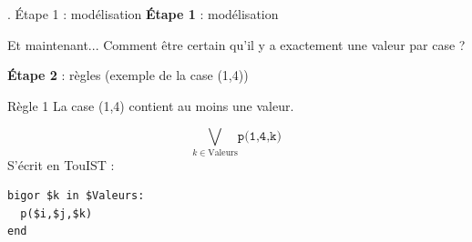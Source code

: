 \documentclass[english,french,usenames,dvipsnames]{beamer}
\begin{document}
\begin{frame}{\subsecname. Étape 1 : modélisation}
\textbf{Étape 1} : modélisation
\begin{block}{Et maintenant...}
Comment être certain qu'il y a exactement une valeur par case ?
\end{block}
\end{frame}

\begin{frame}[containsverbatim]{\subsecname}
\textbf{Étape 2} : règles (exemple de la case (1,4))
\begin{exampleblock}{Règle 1}
La case (1,4) contient au moins une valeur.
\end{exampleblock}
\[\bigvee_{k\in \text{Valeurs}} \texttt{p(1,4,k)}\]
S'écrit en TouIST :
\begin{small}
\begin{verbatim}
bigor $k in $Valeurs:
  p($i,$j,$k)
end
\end{verbatim}
\end{small}
\end{frame}
\end{document}
